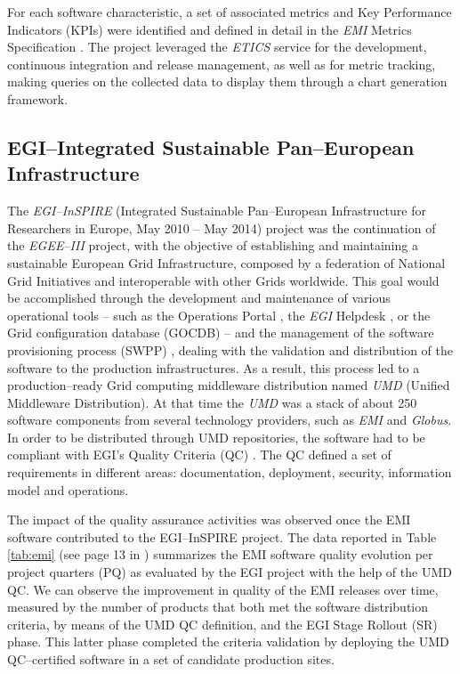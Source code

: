 For each software characteristic, a set of associated
metrics and Key Performance Indicators (KPIs) were identified and defined in
detail in the {\sl EMI} Metrics Specification \cite{emi-quality-model}. The project
leveraged the {\sl ETICS} service for the development, continuous integration and release management,
as well as for metric tracking, making queries on the collected data to display
them through a chart generation framework.



\subsection{EGI--Integrated Sustainable Pan--European Infrastructure}

The {\sl EGI--InSPIRE} (Integrated Sustainable Pan--European Infrastructure for
Researchers in Europe, May 2010 -- May 2014) project \cite{cordis:egi-inspire}
was the continuation of the {\sl EGEE--III} project, with the objective of establishing and
maintaining a sustainable European Grid Infrastructure, composed by a federation of National
Grid Initiatives and interoperable with other Grids worldwide.
This goal would be accomplished through the
development and maintenance of various operational tools -- such as the Operations Portal \cite{egi-ops},
the {\sl EGI} Helpdesk \cite{ggus}, or the Grid configuration database (GOCDB) \cite{gocdb} -- and the
management of the software provisioning process (SWPP) \cite{mario}, dealing with the validation and distribution of the software to
the production infrastructures. As a result, this process led to a production--ready
Grid computing middleware distribution named {\sl UMD} (Unified Middleware Distribution). At that time the {\sl UMD}
was a stack of about 250 software components from several technology providers, such
as {\sl EMI} and {\sl Globus}. In order to be distributed through UMD
repositories, the software had to be compliant with EGI's Quality Criteria (QC) \cite{egi-qc}. The
QC defined a set of requirements in different areas: documentation, deployment, security, information
model and operations.


The impact of the quality assurance activities was observed once the EMI software contributed to the
EGI--InSPIRE project. The data reported in Table \ref{tab:emi} (see page 13 in \cite{emi-quality-model})
summarizes the EMI software quality evolution per project quarters (PQ) as evaluated by the EGI project
with the help of the UMD QC. We can observe the improvement in quality of the EMI releases over time,
measured by the number of products that both met the software distribution criteria, by means of the UMD QC
definition, and the EGI Stage Rollout (SR) phase. This latter phase completed the criteria validation by
deploying the UMD QC--certified software in a set of candidate production sites.

